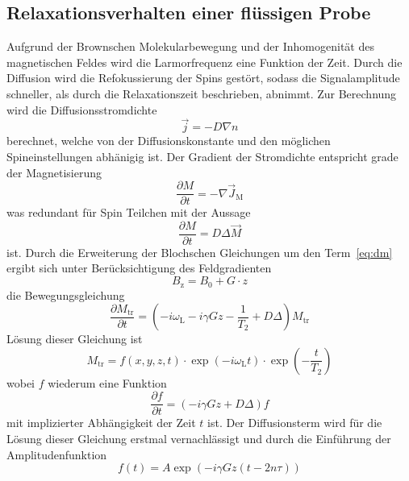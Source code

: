 \subsection{Relaxationsverhalten einer flüssigen Probe}%
\label{sub:relaxationsverhalten_einer_fluessigen_probe}
Aufgrund der Brownschen Molekularbewegung und der Inhomogenität des
magnetischen Feldes wird die Larmorfrequenz eine Funktion der Zeit. 
Durch die Diffusion wird die Refokussierung der Spins gestört, sodass die
Signalamplitude schneller, als durch die Relaxationszeit beschrieben, abnimmt.
Zur Berechnung wird die Diffusionsstromdichte 
\begin{equation}
		\vec{j} = -D \nabla n	
\end{equation}
berechnet, welche von der Diffusionskonstante und den möglichen
Spineinstellungen abhänigig ist. 
Der Gradient der Stromdichte entspricht grade der Magnetisierung
\begin{equation}
		\frac{\partial M}{\partial t} = - \nabla \vec{J}_\text{M}
\end{equation}
was redundant für Spin  Teilchen mit der Aussage 
\begin{equation}
		\label{eq:dm}
		\frac{\partial M}{\partial t} = D \Delta \vec{M}
\end{equation}
ist. Durch die Erweiterung der Blochschen Gleichungen um den Term~\ref{eq:dm}
ergibt sich unter Berücksichtigung des Feldgradienten
\begin{equation}
		\label{eq:gradB}
		B_\text{z} = B_0 + G \cdot z
\end{equation}
die Bewegungsgleichung
\begin{equation}
		\frac{\partial M_\text{tr}}{\partial t} = \left(- i \omega_\text{L} - i \gamma
Gz - \frac{1}{T_2} + D \Delta \right) M_\text{tr}
\end{equation}
Lösung dieser Gleichung ist 
\begin{equation}
		M_\text{tr} = f(x,y,z,t) \cdot \exp(-i\omega_\text{L}t) \cdot
		\exp\left(-\frac{t}{T_\text{2}}\right)
\end{equation}
wobei $f$ wiederum eine Funktion  
\begin{equation}
		\frac{\partial f}{\partial t} = \left(-i \gamma Gz + D \Delta \right) f
\end{equation}
mit implizierter Abhängigkeit der Zeit $t$ ist.
Der Diffusionsterm wird für die Lösung dieser Gleichung erstmal vernachlässigt 
und durch die Einführung der Amplitudenfunktion 
\begin{equation}
		f(t) = A \exp \left( -i \gamma Gz ( t -2n\tau) \right)
\end{equation}
